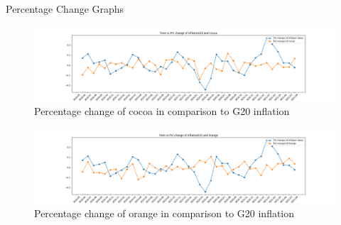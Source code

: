 \begin{frame}{Percentage Change Graphs}
    \begin{figure} [H]
	\begin{center}
		\includegraphics[scale=0.2]{images/illustrate/pct_change_inflation_and_Cocoa.png}
	\end{center}
	\caption{Percentage change of cocoa in comparison to G20 inflation  }
	\label{fig:log-archi}
\end{figure}


\begin{figure} [H]
	\begin{center}
		\includegraphics[scale=0.2]{images/illustrate/pct_change_inflation_and_Orange.png}
	\end{center}
	\caption{Percentage change of orange in comparison to G20 inflation  }
	\label{fig:log-archi}
\end{figure}

\end{frame}



